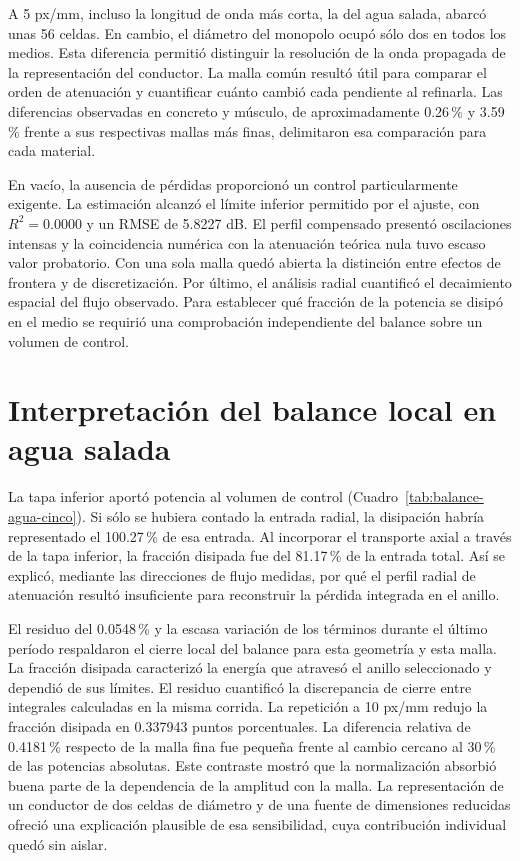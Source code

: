 A 5 px/mm, incluso la longitud de onda más corta, la del agua salada, abarcó unas 56 celdas. En cambio, el diámetro del monopolo ocupó sólo dos en todos los medios. Esta diferencia permitió distinguir la resolución de la onda propagada de la representación del conductor. La malla común resultó útil para comparar el orden de atenuación y cuantificar cuánto cambió cada pendiente al refinarla. Las diferencias observadas en concreto y músculo, de aproximadamente 0.26\,\% y 3.59\,\% frente a sus respectivas mallas más finas, delimitaron esa comparación para cada material.

En vacío, la ausencia de pérdidas proporcionó un control particularmente exigente. La estimación alcanzó el límite inferior permitido por el ajuste, con $R^2=0.0000$ y un RMSE de 5.8227 dB. El perfil compensado presentó oscilaciones intensas y la coincidencia numérica con la atenuación teórica nula tuvo escaso valor probatorio. Con una sola malla quedó abierta la distinción entre efectos de frontera y de discretización. Por último, el análisis radial cuantificó el decaimiento espacial del flujo observado. Para establecer qué fracción de la potencia se disipó en el medio se requirió una comprobación independiente del balance sobre un volumen de control.

\section{Interpretación del balance local en agua salada}
La tapa inferior aportó potencia al volumen de control (Cuadro~\ref{tab:balance-agua-cinco}). Si sólo se hubiera contado la entrada radial, la disipación habría representado el 100.27\,\% de esa entrada. Al incorporar el transporte axial a través de la tapa inferior, la fracción disipada fue del 81.17\,\% de la entrada total. Así se explicó, mediante las direcciones de flujo medidas, por qué el perfil radial de atenuación resultó insuficiente para reconstruir la pérdida integrada en el anillo.

El residuo del 0.0548\,\% y la escasa variación de los términos durante el último período respaldaron el cierre local del balance para esta geometría y esta malla. La fracción disipada caracterizó la energía que atravesó el anillo seleccionado y dependió de sus límites. El residuo cuantificó la discrepancia de cierre entre integrales calculadas en la misma corrida. La repetición a 10 px/mm redujo la fracción disipada en 0.337943 puntos porcentuales. La diferencia relativa de 0.4181\,\% respecto de la malla fina fue pequeña frente al cambio cercano al 30\,\% de las potencias absolutas. Este contraste mostró que la normalización absorbió buena parte de la dependencia de la amplitud con la malla. La representación de un conductor de dos celdas de diámetro y de una fuente de dimensiones reducidas ofreció una explicación plausible de esa sensibilidad, cuya contribución individual quedó sin aislar.


